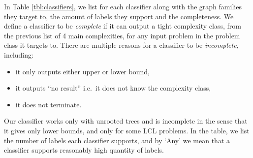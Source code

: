 In Table \ref{tbl:classifiers}, we list for each classifier along with the graph families they target to, the amount of labels they support and the completeness.
We define a classifier to be \emph{complete} if it can output a tight complexity class, from the previous list of 4 main complexities, for any input problem in the problem class it targets to.
There are multiple reasons for a classifier to be \emph{incomplete}, including:
\begin{itemize}
    \item it only outputs either upper or lower bound,
    \item it outputs ``no result'' i.e.\ it does not know the complexity class,
    \item it does not terminate.
\end{itemize}
Our classifier works only with unrooted trees and is incomplete in the sense that it gives only lower bounds, and only for some LCL problems.
In the table, we list the number of labels each classifier supports, and by `Any' we mean that a classifier supports reasonably high quantity of labels.
